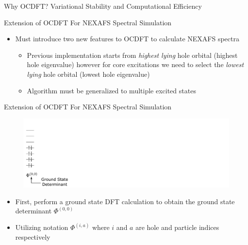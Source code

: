 \documentclass[t]{beamer}
\begin{document}
\begin{frame}{Why OCDFT? Variational Stability and Computational Efficiency}

\end{frame}

\begin{frame}{Extension of OCDFT For NEXAFS Spectral Simulation}
\begin{itemize}
\item Must introduce two new features to OCDFT to calculate NEXAFS spectra
		\begin{itemize}
		\item Previous implementation starts from \textit{highest lying} hole orbital (highest hole eigenvalue) however for core excitations we need to select the \textit{lowest lying} hole orbital (lowest hole eigenvalue)
		\item Algorithm must be generalized to multiple excited states
		\end{itemize}
\end{itemize}
\end{frame}

\begin{frame}{Extension of OCDFT For NEXAFS Spectral Simulation}
\begin{figure}[!t]
\includegraphics[scale=0.65]{CMHP_alg1.pdf}
\end{figure}
\begin{itemize}
\item First, perform a ground state DFT calculation to obtain the ground state determinant $\Phi^{(0,0)}$
\item Utilizing notation $\Phi^{(i,a)}$ where $i$ and $a$ are hole and particle indices respectively
\end{itemize}
\end{frame}
\end{document}

